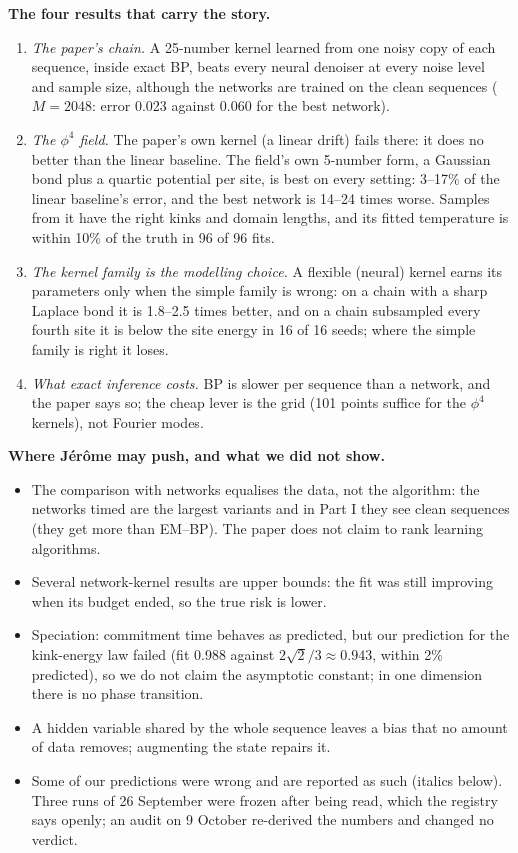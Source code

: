 \documentclass[11pt,a4paper]{article}
\begin{document}
\textbf{The four results that carry the story.}
\begin{enumerate}[leftmargin=1.6em]
\item \emph{The paper's chain.} A 25-number kernel learned from one noisy copy of each sequence, inside exact BP, beats every neural
denoiser at every noise level and sample size, although the networks are trained on the clean sequences ($M=2048$: error 0.023
against 0.060 for the best network).
\item \emph{The $\phi^4$ field.} The paper's own kernel (a linear drift) fails there: it does no better than the linear baseline.
The field's own 5-number form, a Gaussian bond plus a quartic potential per site, is best on every setting: 3--17\% of the linear
baseline's error, and the best network is 14--24 times worse. Samples from it have the right kinks and domain lengths, and its fitted
temperature is within 10\% of the truth in 96 of 96 fits.
\item \emph{The kernel family is the modelling choice.} A flexible (neural) kernel earns its parameters only when the simple
family is wrong: on a chain with a sharp Laplace bond it is 1.8--2.5 times better, and on a chain subsampled every fourth site it is
below the site energy in 16 of 16 seeds; where the simple family is right it loses.
\item \emph{What exact inference costs.} BP is slower per sequence than a network, and the paper says so; the cheap lever is the grid
(101 points suffice for the $\phi^4$ kernels), not Fourier modes.
\end{enumerate}

\textbf{Where Jérôme may push, and what we did not show.}
\begin{itemize}
\item The comparison with networks equalises the data, not the algorithm: the networks timed are the largest variants and in Part I they
see clean sequences (they get more than EM--BP). The paper does not claim to rank learning algorithms.
\item Several network-kernel results are upper bounds: the fit was still improving when its budget ended, so the true risk is lower.
\item Speciation: commitment time behaves as predicted, but our prediction for the kink-energy law failed (fit 0.988 against
$2\sqrt2/3\approx0.943$, within 2\% predicted), so we do not claim the asymptotic constant; in one dimension there is no phase transition.
\item A hidden variable shared by the whole sequence leaves a bias that no amount of data removes; augmenting the state repairs it.
\item Some of our predictions were wrong and are reported as such (italics below). Three runs of 26 September were frozen after
being read, which the registry says openly; an audit on 9 October re-derived the numbers and changed no verdict.
\end{itemize}
\end{document}
